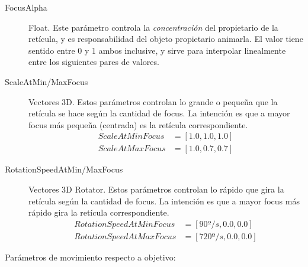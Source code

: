 \documentclass[12pt]{report}
\begin{document}
\begin{description}
	\item[FocusAlpha] Float. Este parámetro controla la \textit{concentración} del propietario de la retícula, y es responsabilidad del objeto propietario animarla. El valor tiene sentido entre 0 y 1 ambos inclusive, y sirve para interpolar linealmente entre los siguientes pares de valores.
	\item[ScaleAtMin/MaxFocus] Vectores 3D. Estos parámetros controlan lo grande o pequeña que la retícula se hace según la cantidad de focus. La intención es que a mayor focus más pequeña (centrada) es la retícula correspondiente.
    \begin{align}
		ScaleAtMinFocus &= [1.0, 1.0, 1.0] \\
		ScaleAtMaxFocus &= [1.0, 0.7, 0.7]
   	\end{align}
	\item[RotationSpeedAtMin/MaxFocus] Vectores 3D Rotator. Estos parámetros controlan lo rápido que gira la retícula según la cantidad de focus. La intención es que a mayor focus más rápido gira la retícula correspondiente.
    \begin{align}
		RotationSpeedAtMinFocus &= [ 90º/s, 0.0, 0.0] \\
		RotationSpeedAtMaxFocus &= [720º/s, 0.0, 0.0]
   	\end{align}
\end{description}

Parámetros de movimiento respecto a objetivo:
\end{document}
